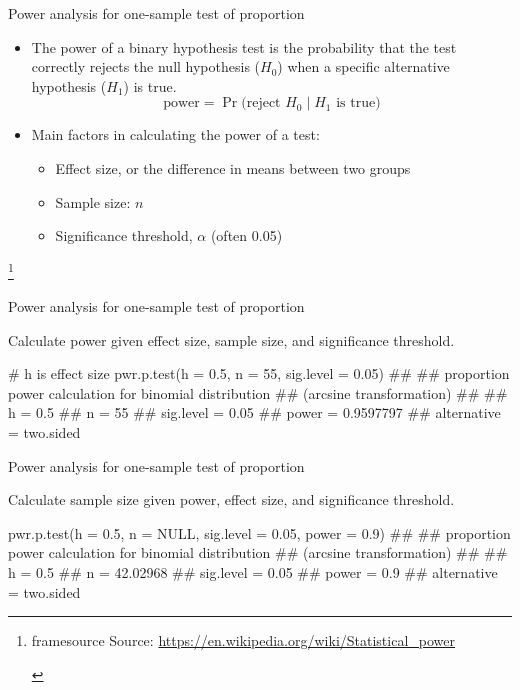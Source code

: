 \documentclass[12pt, t, xcolor=dvipsnames]{beamer}
\newcommand{\source}[1]{{\footnote[nonumber]{%
    \begin{beamercolorbox}[right,wd=\dimexpr\hsize-1.8em\relax]{framesource}
      \usebeamerfont{framesource}\usebeamercolor[fg]{framesource} Source: {#1}
    \end{beamercolorbox}}}}
\begin{document}
\begin{frame}{Power analysis for one-sample test of proportion}
\begin{itemize}
  \item The \alert{power} of a binary hypothesis test is the probability that the test correctly rejects the null hypothesis ($H_0$) when a specific alternative hypothesis ($H_1$) is true. $$\text{power} = \Pr {\big (}{\text{reject }}H_{0}\mid H_{1}{\text{ is true}}{\big )}$$
  \item Main factors in calculating the power of a test:
  \begin{itemize}
    \item Effect size, or the difference in means between two groups
    \item Sample size: $n$
    \item Significance threshold, $\alpha$ (often 0.05)
  \end{itemize}
\end{itemize}

\source{\url{https://en.wikipedia.org/wiki/Statistical_power}}
\end{frame}

\begin{frame}[fragile]{Power analysis for one-sample test of proportion}

Calculate power given effect size, sample size, and significance threshold.

\begin{Rcode}
# h is effect size
pwr.p.test(h = 0.5, n = 55, sig.level = 0.05)
## 
##      proportion power calculation for binomial distribution 
##      (arcsine transformation) 
## 
##               h = 0.5
##               n = 55
##       sig.level = 0.05
##           power = 0.9597797
##     alternative = two.sided
\end{Rcode}

\end{frame}



\begin{frame}[fragile]{Power analysis for one-sample test of proportion}

Calculate sample size given power, effect size, and significance threshold.

\begin{Rcode}
pwr.p.test(h = 0.5, n = NULL, sig.level = 0.05, power = 0.9)
## 
##      proportion power calculation for binomial distribution 
##      (arcsine transformation) 
## 
##               h = 0.5
##               n = 42.02968
##       sig.level = 0.05
##           power = 0.9
##     alternative = two.sided
\end{Rcode}

\end{frame}
\end{document}
